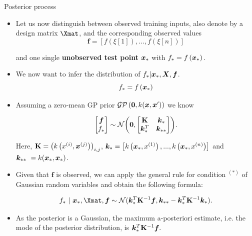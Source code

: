 \begin{vbframe}{Posterior process}

% 
% 

\begin{itemize}
  \item Let us now distinguish between observed training inputs, also denote by a design matrix $\Xmat$, and the corresponding observed values
  $$
    \bm{f} = \left[f\left(\xi[1]\right), ..., f\left(\xi[n]\right)\right]
  $$ 

and one single \textbf{unobserved test point} $\xv_*$ with $f_* = f\left(\xv_*\right).$

\item We now want to infer the distribution of $f_* | \xv_*, \bm{X}, \bm{f}$.
  $$
    f_* = f\left(\xv_*\right)
  $$  
  \item Assuming a zero-mean GP prior $\mathcal{GP}\left(\bm{0}, k(\xv, \xv^\prime)\right)$ we know

$$
\begin{bmatrix}
\bm{f} \\
f_*
\end{bmatrix} \sim  
\mathcal{N}\biggl(\bm{0}, \begin{bmatrix} \Kmat & \bm{k}_* \\ \bm{k}_*^T & \bm{k}_{**}\end{bmatrix}\biggr).
$$

Here, $\Kmat = \left(k\left(\xi, \xv^{(j)}\right)\right)_{i,j}$, $\bm{k}_* = \left[k\left(\xv_*, \xi[1]\right), ..., k\left(\xv_*, \xi[n]\right)\right]$ and $ \bm{k}_{**}\ = k(\xv_*, \xv_*)$. 

\framebreak 

\item Given that $\bm{f}$ is observed, we can apply the general rule for condition $^{(*)}$ of Gaussian random variables and obtain the following formula: 

\begin{eqnarray*}
f_* ~|~ \xv_*, \Xmat, \bm{f} \sim \mathcal{N}(\bm{k}_{*}^{T}\Kmat^{-1}\bm{f}, \bm{k}_{**} - \bm{k}_*^T \Kmat ^{-1}\bm{k}_*).
\end{eqnarray*}

\item As the posterior is a Gaussian, the maximum a-posteriori estimate, i.e. the mode of the posterior distribution, is $\bm{k}_{*}^{T}\Kmat^{-1}\bm{f}. $
\end{itemize}


\end{vbframe}
